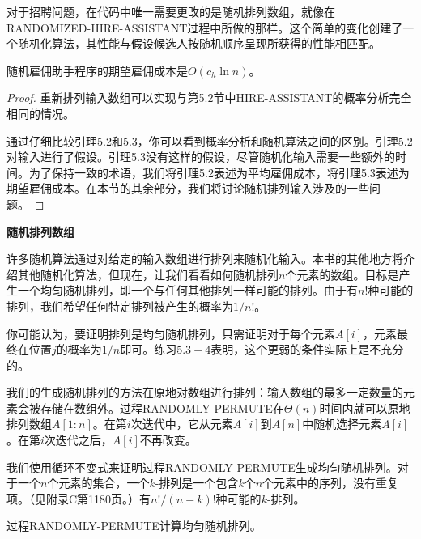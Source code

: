 \documentclass[lang=cn,newtx,10pt,scheme=chinese]{elegantbook}
\begin{document}
对于招聘问题，在代码中唯一需要更改的是随机排列数组，就像在RANDOMIZED-HIRE-ASSISTANT过程中所做的那样。这个简单的变化创建了一个随机化算法，其性能与假设候选人按随机顺序呈现所获得的性能相匹配。

\begin{lemma}{}{}
随机雇佣助手程序的期望雇佣成本是$O\left(c_h \ln n\right)$。
\end{lemma}

\begin{proof}
重新排列输入数组可以实现与第5.2节中HIRE-ASSISTANT的概率分析完全相同的情况。

通过仔细比较引理5.2和5.3，你可以看到概率分析和随机算法之间的区别。引理5.2对输入进行了假设。引理5.3没有这样的假设，尽管随机化输入需要一些额外的时间。为了保持一致的术语，我们将引理5.2表述为平均雇佣成本，将引理5.3表述为期望雇佣成本。在本节的其余部分，我们将讨论随机排列输入涉及的一些问题。
\end{proof}

\textbf{随机排列数组}

许多随机算法通过对给定的输入数组进行排列来随机化输入。本书的其他地方将介绍其他随机化算法，但现在，让我们看看如何随机排列$n$个元素的数组。目标是产生一个均匀随机排列，即一个与任何其他排列一样可能的排列。由于有$n$!种可能的排列，我们希望任何特定排列被产生的概率为$1 / n !$。

你可能认为，要证明排列是均匀随机排列，只需证明对于每个元素$A[i]$，元素最终在位置$j$的概率为$1 / n$即可。练习$5.3-4$表明，这个更弱的条件实际上是不充分的。

我们的生成随机排列的方法在原地对数组进行排列：输入数组的最多一定数量的元素会被存储在数组外。过程RANDOMLY-PERMUTE在$\Theta(n)$时间内就可以原地排列数组$A[1:n]$。在第$i$次迭代中，它从元素$A[i]$到$A[n]$中随机选择元素$A[i]$。在第$i$次迭代之后，$A[i]$不再改变。

我们使用循环不变式来证明过程RANDOMLY-PERMUTE生成均匀随机排列。对于一个$n$个元素的集合，一个$k$-排列是一个包含$k$个$n$个元素中的序列，没有重复项。（见附录C第1180页。）有$n!/(n-k)$!种可能的$k$-排列。

\begin{lemma}{}{}
过程RANDOMLY-PERMUTE计算均匀随机排列。
\end{lemma}
\end{document}
